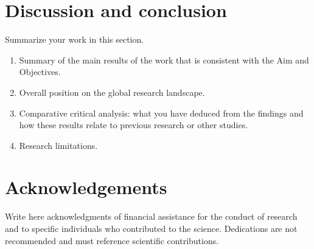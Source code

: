 \chapter{Discussion and conclusion}
    Summarize your work in this section.
    \begin{enumerate}
        \item Summary of the main results of the work that is consistent with the Aim and Objectives.
        \item Overall position on the global research landscape.
        \item Comparative critical analysis: what you have deduced from the findings and how these results relate to previous research or other studies.
        \item Research limitations.
    \end{enumerate}
    
\newpage
\chapter*{Acknowledgements}
    Write here acknowledgments of financial assistance for the conduct of research and to specific individuals who contributed to the science. 
    Dedications are not recommended and must reference scientific contributions.